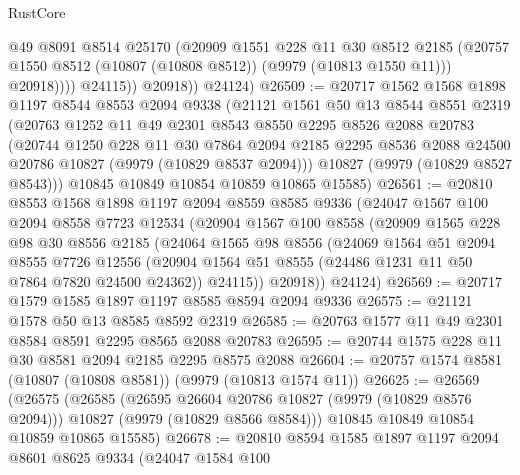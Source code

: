 \begin{lexlean}{RustCore}
\begin{coremodule}
                    @49
                    @8091
                    @8514
                    @25170
                    (@20909
                      @1551
                      @228
                      @11
                      @30
                      @8512
                      @2185
                      (@20757 @1550 @8512 (@10807 (@10808 @8512)) (@9979 (@10813 @1550 @11)))
                      @20918))))
              @24115))
          @20918))
      @24124)
@26509 := @20717
    @1562
    @1568
    @1898
    @1197
    @8544
    @8553
    @2094
    @9338
    (@21121
      @1561
      @50
      @13
      @8544
      @8551
      @2319
      (@20763
        @1252
        @11
        @49
        @2301
        @8543
        @8550
        @2295
        @8526
        @2088
        @20783
        (@20744
          @1250
          @228
          @11
          @30
          @7864
          @2094
          @2185
          @2295
          @8536
          @2088
          @24500
          @20786
          @10827
          (@9979 (@10829 @8537 @2094)))
        @10827
        (@9979 (@10829 @8527 @8543)))
      @10845
      @10849
      @10854
      @10859
      @10865
      @15585)
@26561 := @20810
    @8553
    @1568
    @1898
    @1197
    @2094
    @8559
    @8585
    @9336
    (@24047
      @1567
      @100
      @2094
      @8558
      @7723
      @12534
      (@20904
        @1567
        @100
        @8558
        (@20909
          @1565
          @228
          @98
          @30
          @8556
          @2185
          (@24064
            @1565
            @98
            @8556
            (@24069
              @1564
              @51
              @2094
              @8555
              @7726
              @12556
              (@20904 @1564 @51 @8555 (@24486 @1231 @11 @50 @7864 @7820 @24500 @24362))
              @24115))
          @20918))
      @24124)
@26569 := @20717 @1579 @1585 @1897 @1197 @8585 @8594 @2094 @9336
@26575 := @21121 @1578 @50 @13 @8585 @8592 @2319
@26585 := @20763 @1577 @11 @49 @2301 @8584 @8591 @2295 @8565 @2088 @20783
@26595 := @20744 @1575 @228 @11 @30 @8581 @2094 @2185 @2295 @8575 @2088
@26604 := @20757 @1574 @8581 (@10807 (@10808 @8581)) (@9979 (@10813 @1574 @11))
@26625 := @26569
    (@26575
      (@26585
        (@26595 @26604 @20786 @10827 (@9979 (@10829 @8576 @2094)))
        @10827
        (@9979 (@10829 @8566 @8584)))
      @10845
      @10849
      @10854
      @10859
      @10865
      @15585)
@26678 := @20810
    @8594
    @1585
    @1897
    @1197
    @2094
    @8601
    @8625
    @9334
    (@24047
      @1584
      @100

\end{coremodule}
\end{lexlean}

